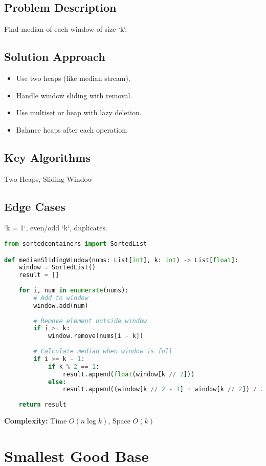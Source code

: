 \documentclass[10pt, a4paper]{article}
\begin{document}
\subsection*{Problem Description}
Find median of each window of size `k`.

\subsection*{Solution Approach}
\begin{itemize}
    \item Use two heaps (like median stream).
    \item Handle window sliding with removal.
    \item Use multiset or heap with lazy deletion.
    \item Balance heaps after each operation.
\end{itemize}

\subsection*{Key Algorithms}
Two Heaps, Sliding Window

\subsection*{Edge Cases}
`k = 1`, even/odd `k`, duplicates.

\begin{lstlisting}[language=Python]
from sortedcontainers import SortedList

def medianSlidingWindow(nums: List[int], k: int) -> List[float]:
    window = SortedList()
    result = []
    
    for i, num in enumerate(nums):
        # Add to window
        window.add(num)
        
        # Remove element outside window
        if i >= k:
            window.remove(nums[i - k])
        
        # Calculate median when window is full
        if i >= k - 1:
            if k % 2 == 1:
                result.append(float(window[k // 2]))
            else:
                result.append((window[k // 2 - 1] + window[k // 2]) / 2)
    
    return result
\end{lstlisting}
\textbf{Complexity:} Time $O(n \log k)$, Space $O(k)$

\section{Smallest Good Base}
\end{document}
